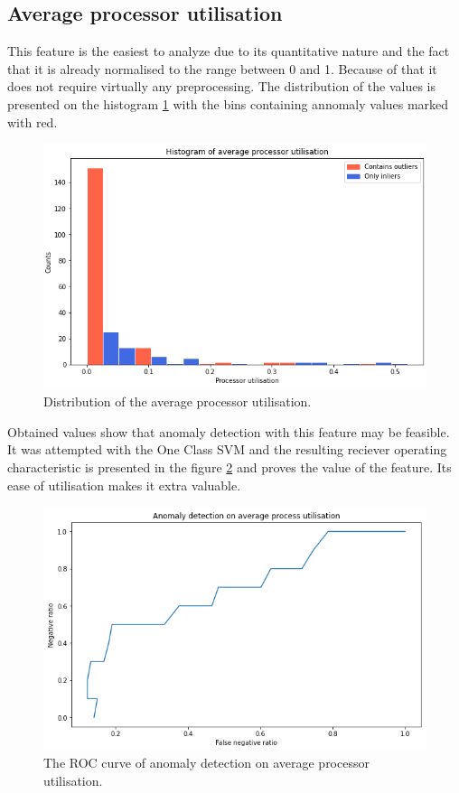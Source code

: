 \documentclass[a4paper,twoside,12pt]{book}
\begin{document}
\subsection{Average processor utilisation}

This feature is the easiest to analyze due to its quantitative nature and the fact that it is
already normalised to the range between 0 and 1. Because of that it does not require virtually 
any preprocessing. The distribution of the values is presented on the histogram \ref{fig:histavgproc}
with the bins containing annomaly values marked with red. 

\begin{figure}
	\centering
	\includegraphics[scale=0.9]{images/HistAvgProcs}
	\caption{Distribution of the average processor utilisation.}
	\label{fig:histavgproc}
 \end{figure}

Obtained values show that anomaly detection with this feature may be feasible. It was attempted with 
the One Class SVM and the resulting reciever operating characteristic is presented in the figure
\ref{fig:procroc} and proves the value of the feature. Its ease of utilisation makes it extra valuable.

\begin{figure}
	\centering
	\includegraphics[scale=0.9]{images/ProcROCKF}
	\caption{The ROC curve of anomaly detection on average processor utilisation.}
	\label{fig:procroc}
 \end{figure}
\end{document}
